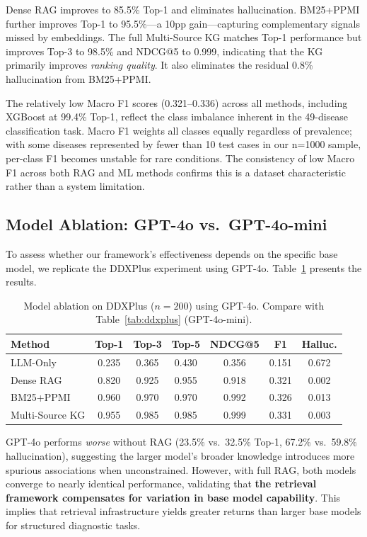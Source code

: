 \documentclass[preprint,12pt]{elsarticle}
\begin{document}
Dense RAG improves to 85.5\% Top-1 and eliminates hallucination. BM25+PPMI further improves Top-1 to 95.5\%---a 10pp gain---capturing complementary signals missed by embeddings. The full Multi-Source KG matches Top-1 performance but improves Top-3 to 98.5\% and NDCG@5 to 0.999, indicating that the KG primarily improves \emph{ranking quality}. It also eliminates the residual 0.8\% hallucination from BM25+PPMI.

The relatively low Macro F1 scores (0.321–0.336) across all methods, including XGBoost at 99.4\% Top-1, reflect the class imbalance inherent in the 49-disease classification task. Macro F1 weights all classes equally regardless of prevalence; with some diseases represented by fewer than 10 test cases in our n=1000 sample, per-class F1 becomes unstable for rare conditions. The consistency of low Macro F1 across both RAG and ML methods confirms this is a dataset characteristic rather than a system limitation.

\subsection{Model Ablation: GPT-4o vs.\ GPT-4o-mini}
\label{sec:model_ablation}

To assess whether our framework's effectiveness depends on the specific base model, we replicate the DDXPlus experiment using GPT-4o. Table~\ref{tab:gpt4o} presents the results.

\begin{table}[t]
\centering
\caption{Model ablation on DDXPlus ($n{=}200$) using GPT-4o. Compare with Table~\ref{tab:ddxplus} (GPT-4o-mini).}
\label{tab:gpt4o}
\begin{tabular}{lcccccc}
\toprule
\textbf{Method} & \textbf{Top-1} & \textbf{Top-3} & \textbf{Top-5} & \textbf{NDCG@5} & \textbf{F1} & \textbf{Halluc.} \\
\midrule
LLM-Only       & 0.235 & 0.365 & 0.430 & 0.356 & 0.151 & 0.672 \\
Dense RAG       & 0.820 & 0.925 & 0.955 & 0.918 & 0.321 & 0.002 \\
BM25+PPMI       & 0.960 & 0.970 & 0.970 & 0.992 & 0.326 & 0.013 \\
Multi-Source KG  & 0.955 & 0.985 & 0.985 & 0.999 & 0.331 & 0.003 \\
\bottomrule
\end{tabular}
\end{table}

GPT-4o performs \emph{worse} without RAG (23.5\% vs.\ 32.5\% Top-1, 67.2\% vs.\ 59.8\% hallucination), suggesting the larger model's broader knowledge introduces more spurious associations when unconstrained. However, with full RAG, both models converge to nearly identical performance, validating that \textbf{the retrieval framework compensates for variation in base model capability}. This implies that retrieval infrastructure yields greater returns than larger base models for structured diagnostic tasks.
\end{document}
